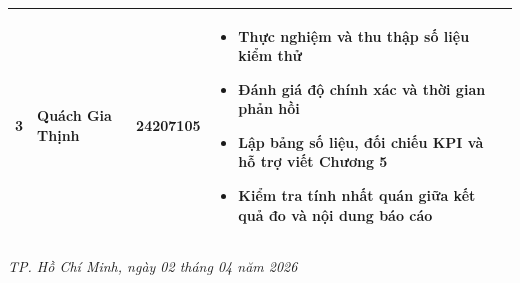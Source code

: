 \begin{singlespace}
\begin{center}
\begin{tabular}{c >{\raggedright\arraybackslash}p{3.2cm} c >{\raggedright\arraybackslash}p{7.0cm} c}
  \midrule

  3 &
  Quách Gia Thịnh &
  24207105 &
  \vspace{-8pt}\begin{itemize}[leftmargin=1em, topsep=0pt, itemsep=0pt, parsep=0pt]
    \item Thực nghiệm và thu thập số liệu kiểm thử
    \item Đánh giá độ chính xác và thời gian phản hồi
    \item Lập bảng số liệu, đối chiếu KPI và hỗ trợ viết Chương 5
    \item Kiểm tra tính nhất quán giữa kết quả đo và nội dung báo cáo
  \end{itemize}\vspace{-4pt} &
  \\

  \bottomrule
\end{tabular}
\end{center}

\vspace{0.25cm}
\begin{flushright}
  {\footnotesize\textit{TP. Hồ Chí Minh, ngày 02 tháng 04 năm 2026}}
\end{flushright}

\end{singlespace}

